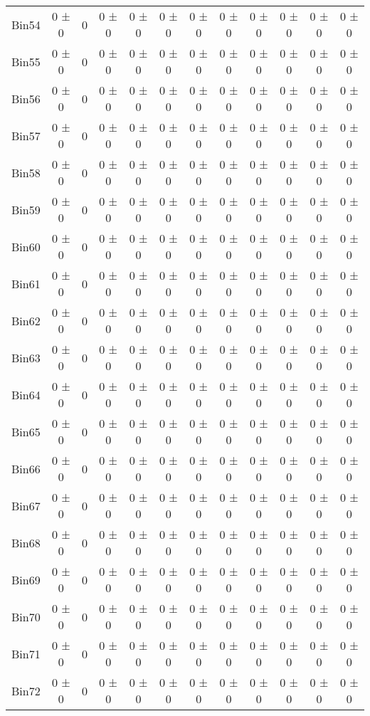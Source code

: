\begin{tabular}{@{\extracolsep{4pt}}lccccccccccc@{}}
     Bin54 & 0 ± 0 & 0 & 0 ± 0 & 0 ± 0 & 0 ± 0 & 0 ± 0 & 0 ± 0 & 0 ± 0 & 0 ± 0 & 0 ± 0 & 0 ± 0 \\ 
     Bin55 & 0 ± 0 & 0 & 0 ± 0 & 0 ± 0 & 0 ± 0 & 0 ± 0 & 0 ± 0 & 0 ± 0 & 0 ± 0 & 0 ± 0 & 0 ± 0 \\ 
     Bin56 & 0 ± 0 & 0 & 0 ± 0 & 0 ± 0 & 0 ± 0 & 0 ± 0 & 0 ± 0 & 0 ± 0 & 0 ± 0 & 0 ± 0 & 0 ± 0 \\ 
     Bin57 & 0 ± 0 & 0 & 0 ± 0 & 0 ± 0 & 0 ± 0 & 0 ± 0 & 0 ± 0 & 0 ± 0 & 0 ± 0 & 0 ± 0 & 0 ± 0 \\ 
     Bin58 & 0 ± 0 & 0 & 0 ± 0 & 0 ± 0 & 0 ± 0 & 0 ± 0 & 0 ± 0 & 0 ± 0 & 0 ± 0 & 0 ± 0 & 0 ± 0 \\ 
     Bin59 & 0 ± 0 & 0 & 0 ± 0 & 0 ± 0 & 0 ± 0 & 0 ± 0 & 0 ± 0 & 0 ± 0 & 0 ± 0 & 0 ± 0 & 0 ± 0 \\ 
     Bin60 & 0 ± 0 & 0 & 0 ± 0 & 0 ± 0 & 0 ± 0 & 0 ± 0 & 0 ± 0 & 0 ± 0 & 0 ± 0 & 0 ± 0 & 0 ± 0 \\ 
     Bin61 & 0 ± 0 & 0 & 0 ± 0 & 0 ± 0 & 0 ± 0 & 0 ± 0 & 0 ± 0 & 0 ± 0 & 0 ± 0 & 0 ± 0 & 0 ± 0 \\ 
     Bin62 & 0 ± 0 & 0 & 0 ± 0 & 0 ± 0 & 0 ± 0 & 0 ± 0 & 0 ± 0 & 0 ± 0 & 0 ± 0 & 0 ± 0 & 0 ± 0 \\ 
     Bin63 & 0 ± 0 & 0 & 0 ± 0 & 0 ± 0 & 0 ± 0 & 0 ± 0 & 0 ± 0 & 0 ± 0 & 0 ± 0 & 0 ± 0 & 0 ± 0 \\ 
     Bin64 & 0 ± 0 & 0 & 0 ± 0 & 0 ± 0 & 0 ± 0 & 0 ± 0 & 0 ± 0 & 0 ± 0 & 0 ± 0 & 0 ± 0 & 0 ± 0 \\ 
     Bin65 & 0 ± 0 & 0 & 0 ± 0 & 0 ± 0 & 0 ± 0 & 0 ± 0 & 0 ± 0 & 0 ± 0 & 0 ± 0 & 0 ± 0 & 0 ± 0 \\ 
     Bin66 & 0 ± 0 & 0 & 0 ± 0 & 0 ± 0 & 0 ± 0 & 0 ± 0 & 0 ± 0 & 0 ± 0 & 0 ± 0 & 0 ± 0 & 0 ± 0 \\ 
     Bin67 & 0 ± 0 & 0 & 0 ± 0 & 0 ± 0 & 0 ± 0 & 0 ± 0 & 0 ± 0 & 0 ± 0 & 0 ± 0 & 0 ± 0 & 0 ± 0 \\ 
     Bin68 & 0 ± 0 & 0 & 0 ± 0 & 0 ± 0 & 0 ± 0 & 0 ± 0 & 0 ± 0 & 0 ± 0 & 0 ± 0 & 0 ± 0 & 0 ± 0 \\ 
     Bin69 & 0 ± 0 & 0 & 0 ± 0 & 0 ± 0 & 0 ± 0 & 0 ± 0 & 0 ± 0 & 0 ± 0 & 0 ± 0 & 0 ± 0 & 0 ± 0 \\ 
     Bin70 & 0 ± 0 & 0 & 0 ± 0 & 0 ± 0 & 0 ± 0 & 0 ± 0 & 0 ± 0 & 0 ± 0 & 0 ± 0 & 0 ± 0 & 0 ± 0 \\ 
     Bin71 & 0 ± 0 & 0 & 0 ± 0 & 0 ± 0 & 0 ± 0 & 0 ± 0 & 0 ± 0 & 0 ± 0 & 0 ± 0 & 0 ± 0 & 0 ± 0 \\ 
     Bin72 & 0 ± 0 & 0 & 0 ± 0 & 0 ± 0 & 0 ± 0 & 0 ± 0 & 0 ± 0 & 0 ± 0 & 0 ± 0 & 0 ± 0 & 0 ± 0 \\ 

\end{tabular}
